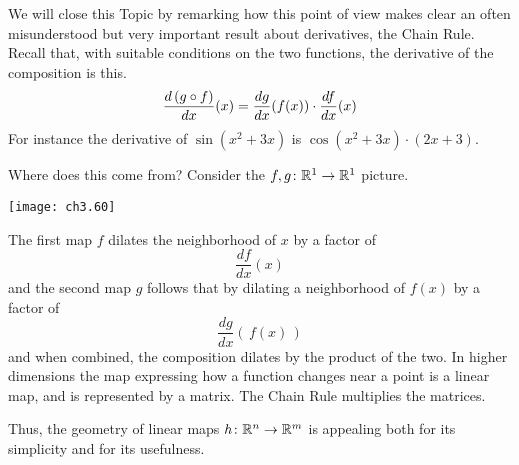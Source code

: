 We will close this Topic by remarking how
this point of view makes clear an often misunderstood but very important 
result about derivatives, the Chain Rule.
Recall that, with suitable conditions on the two functions,
the derivative of the composition is this.
\begin{equation*}
  \frac{d\,(g\mathbin\circ f)}{dx}(x) = 
  \frac{dg}{dx}(f(x))\cdot\frac{df}{dx}(x)
\end{equation*} 
For instance the derivative of $\sin(x^2+3x)$ is
$\cos(x^2+3x)\cdot(2x+3)$.

Where does this come from?
Consider the $\mbox{$f,g\colon \mathbb{R}^1\to \mathbb{R}^1$}$ picture. 
\begin{center}
  \texttt{[image: ch3.60]}
\end{center}
The first map $f$ dilates the neighborhood of $x$ by a factor of 
\begin{equation*}
  \frac{df}{dx}(x) 
\end{equation*}
and the second map $g$ follows that by dilating 
a neighborhood of $f(x)$ by a factor of 
\begin{equation*}
  \frac{dg}{dx}(\,f(x)\,) 
\end{equation*}
and when combined, 
the composition dilates by the product of the two.
In higher dimensions 
the map expressing how a function changes near a point is a linear map,
and is represented by a matrix.
The Chain Rule multiplies the matrices.

Thus, the geometry of linear maps $\mbox{$h\colon \mathbb{R}^n\to \mathbb{R}^m$}$ 
is appealing both for its simplicity and for its usefulness.

